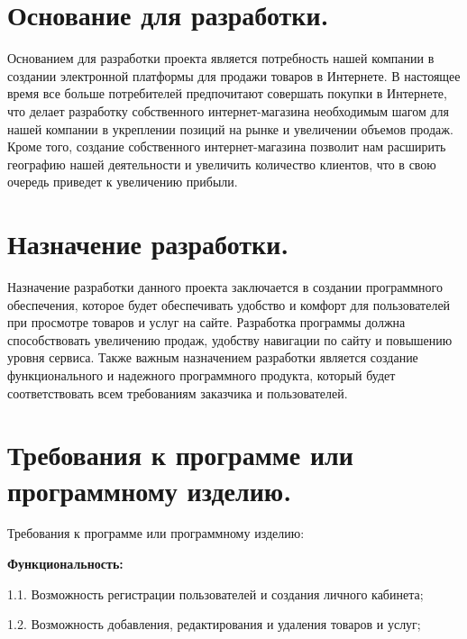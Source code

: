 \newpage
\section{Основание для разработки.}



Основанием для разработки проекта является потребность нашей компании в создании электронной платформы для продажи товаров в Интернете. В настоящее время все больше потребителей предпочитают совершать покупки в Интернете, что делает разработку собственного интернет-магазина необходимым шагом для нашей компании в укреплении позиций на рынке и увеличении объемов продаж. Кроме того, создание собственного интернет-магазина позволит нам расширить географию нашей деятельности и увеличить количество клиентов, что в свою очередь приведет к увеличению прибыли.








\section{Назначение разработки.}



Назначение разработки данного проекта заключается в создании программного обеспечения, которое будет обеспечивать удобство и комфорт для пользователей при просмотре товаров и услуг на сайте. Разработка программы должна способствовать увеличению продаж, удобству навигации по сайту и повышению уровня сервиса. Также важным назначением разработки является создание функционального и надежного программного продукта, который будет соответствовать всем требованиям заказчика и пользователей.







\section{Требования к программе или программному изделию.}





Требования к программе или программному изделию:

    \textbf{Функциональность:}

    1.1. Возможность регистрации пользователей и создания личного кабинета;
    
    1.2. Возможность добавления, редактирования и удаления товаров и услуг;
    
